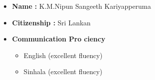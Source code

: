 \documentclass[10pt, letterpaper]{article}
\newenvironment{highlights}{
    \begin{itemize}[
        topsep=0.10 cm,
        parsep=0.10 cm,
        partopsep=0pt,
        itemsep=0pt,
        leftmargin=0.4 cm + 10pt
    ]
}{
    \end{itemize}
} %
\begin{document}
 \begin{highlights}
                \item \textbf{Name :} K.M.Nipun Sangeeth Kariyapperuma 
                \item \textbf{Citizenship :} Sri Lankan
                  \item \textbf{Communication Pro ciency} 
                  
                 \begin{itemize}
                 \item  English (excellent fluency)
                    \item Sinhala (excellent fluency)
                 \end{itemize}
              
          
            \end{highlights}
        
\end{document}
